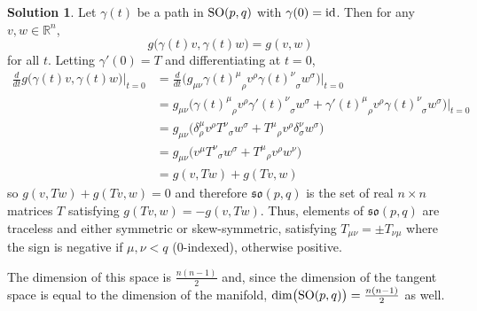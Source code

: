 \documentclass[11pt, a4paper]{report}
\theoremstyle{definition}
\newtheorem{sol}{Solution}[part]
\newcommand*{\SO}{\ensuremath\text{SO}}
\newcommand*{\id}{\ensuremath\mathop{}\mathopen{}\mathrm{id}}
\begin{document}
\begin{sol}

Let $\gamma(t)$ be a path in $\SO(p, q)$ with $\gamma(0) = \id$. Then for any $v, w \in \mathbb{R}^n$,
\[
    g\bigl(\gamma(t)v, \gamma(t) w\bigr) = g(v, w)
\]
for all $t$. Letting $\gamma'(0) = T$ and differentiating at $t = 0$,
\begin{align*}
    \frac{d}{dt} g\bigl(\gamma(t)v, \gamma(t) w\bigr) \Big|_{t = 0} \! &=
        \frac{d}{dt} \bigl(
                g_{\mu\nu} {{\gamma(t)}^\mu}_\rho v^\rho {{\gamma(t)}^\nu}_\sigma w^\sigma
            \bigr) \Big|_{t = 0} \\
        &= g_{\mu\nu} \bigl(
                {{\gamma(t)}^\mu}_\rho v^\rho {{\gamma'(t)}^\nu}_\sigma w^\sigma
                + {{\gamma'(t)}^\mu}_\rho v^\rho {{\gamma(t)}^\nu}_\sigma w^\sigma
            \bigr) \Big|_{t = 0} \\
        &= g_{\mu\nu} \bigl(
                \delta^\mu_\rho v^\rho {T^\nu}_\sigma w^\sigma
                + {T^\mu}_\rho v^\rho \delta^\nu_\sigma w^\sigma
           \bigr) \\
        &= g_{\mu\nu} \bigl(
                v^\mu {T^\nu}_\sigma w^\sigma + {T^\mu}_\rho v^\rho w^\nu
           \bigr) \\
        &= g(v, Tw) + g(Tv, w)
\end{align*}
so $g(v, Tw) + g(Tv, w) = 0$
and therefore $\mathfrak{so}(p, q)$ is the set of real $n \times n$ matrices $T$ satisfying $g(Tv, w) = -g(v, Tw)$.
Thus, elements of $\mathfrak{so}(p, q)$ are traceless and either symmetric or skew-symmetric, satisfying $T_{\mu\nu} = \pm T_{\nu\mu}$ where the sign is negative if $\mu, \nu < q$ (0-indexed), otherwise positive.

The dimension of this space is $\frac{n(n - 1)}{2}$ and,
since the dimension of the tangent space is equal to the dimension of the manifold,
$\dim\bigl(\SO(p, q)\bigr) = \frac{n(n - 1)}{2}$ as well.


\end{sol}
\end{document}
